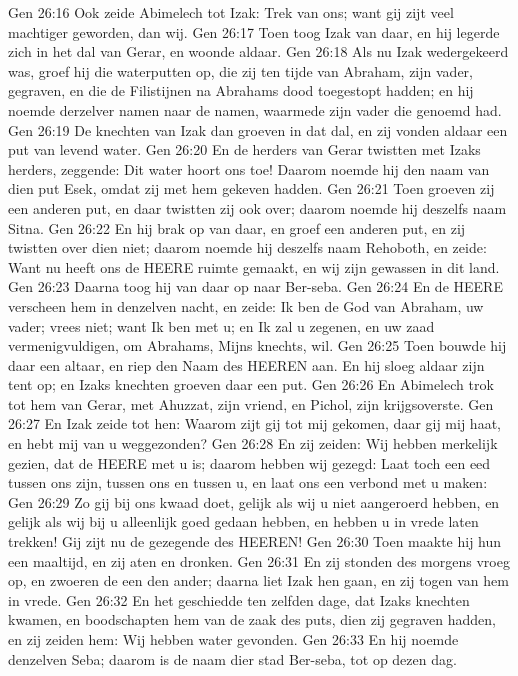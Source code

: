 Gen 26:16  Ook zeide Abimelech tot Izak: Trek van ons; want gij zijt veel machtiger geworden, dan wij.
Gen 26:17  Toen toog Izak van daar, en hij legerde zich in het dal van Gerar, en woonde aldaar.
Gen 26:18  Als nu Izak wedergekeerd was, groef hij die waterputten op, die zij ten tijde van Abraham, zijn vader, gegraven, en die de Filistijnen na Abrahams dood toegestopt hadden; en hij noemde derzelver namen naar de namen, waarmede zijn vader die genoemd had.
Gen 26:19  De knechten van Izak dan groeven in dat dal, en zij vonden aldaar een put van levend water.
Gen 26:20  En de herders van Gerar twistten met Izaks herders, zeggende: Dit water hoort ons toe! Daarom noemde hij den naam van dien put Esek, omdat zij met hem gekeven hadden.
Gen 26:21  Toen groeven zij een anderen put, en daar twistten zij ook over; daarom noemde hij deszelfs naam Sitna.
Gen 26:22  En hij brak op van daar, en groef een anderen put, en zij twistten over dien niet; daarom noemde hij deszelfs naam Rehoboth, en zeide: Want nu heeft ons de HEERE ruimte gemaakt, en wij zijn gewassen in dit land.
Gen 26:23  Daarna toog hij van daar op naar Ber-seba.
Gen 26:24  En de HEERE verscheen hem in denzelven nacht, en zeide: Ik ben de God van Abraham, uw vader; vrees niet; want Ik ben met u; en Ik zal u zegenen, en uw zaad vermenigvuldigen, om Abrahams, Mijns knechts, wil.
Gen 26:25  Toen bouwde hij daar een altaar, en riep den Naam des HEEREN aan. En hij sloeg aldaar zijn tent op; en Izaks knechten groeven daar een put.
Gen 26:26  En Abimelech trok tot hem van Gerar, met Ahuzzat, zijn vriend, en Pichol, zijn krijgsoverste.
Gen 26:27  En Izak zeide tot hen: Waarom zijt gij tot mij gekomen, daar gij mij haat, en hebt mij van u weggezonden?
Gen 26:28  En zij zeiden: Wij hebben merkelijk gezien, dat de HEERE met u is; daarom hebben wij gezegd: Laat toch een eed tussen ons zijn, tussen ons en tussen u, en laat ons een verbond met u maken:
Gen 26:29  Zo gij bij ons kwaad doet, gelijk als wij u niet aangeroerd hebben, en gelijk als wij bij u alleenlijk goed gedaan hebben, en hebben u in vrede laten trekken! Gij zijt nu de gezegende des HEEREN!
Gen 26:30  Toen maakte hij hun een maaltijd, en zij aten en dronken.
Gen 26:31  En zij stonden des morgens vroeg op, en zwoeren de een den ander; daarna liet Izak hen gaan, en zij togen van hem in vrede.
Gen 26:32  En het geschiedde ten zelfden dage, dat Izaks knechten kwamen, en boodschapten hem van de zaak des puts, dien zij gegraven hadden, en zij zeiden hem: Wij hebben water gevonden.
Gen 26:33  En hij noemde denzelven Seba; daarom is de naam dier stad Ber-seba, tot op dezen dag.
